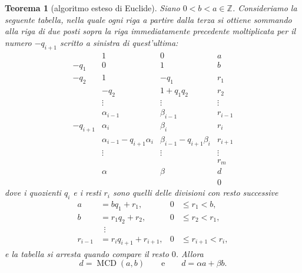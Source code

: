 \documentclass[11pt,a4paper]{article}
\newcommand{\Z}{\mathbb{Z}}
\theoremstyle{definition}
\theoremstyle{plain}
\newtheorem{teorema}[definizione]{Teorema}
\theoremstyle{remark}
\begin{document}
\begin{teorema}[algoritmo esteso di Euclide]\label{thm:euclide}
Siano $0<b<a\in\Z$. Consideriamo la seguente tabella, nella quale ogni riga a partire dalla terza si ottiene sommando alla riga di due posti sopra la riga immediatamente precedente moltiplicata per il numero $-q_{i+1}$ scritto a sinistra di quest'ultima:
\[
\begin{array}{r|rr|r}
 & 1 & 0 & a\\
-q_1 & 0 & 1 & b\\
-q_2 & 1 & -q_1 & r_1\\
 & -q_2 & 1+q_1q_2 & r_2\\[2pt]
 & \vdots & \vdots & \vdots\\[2pt]
 & \alpha_{i-1} & \beta_{i-1} & r_{i-1}\\
-q_{i+1} & \alpha_i & \beta_i & r_i\\
 & \alpha_{i-1}-q_{i+1}\alpha_i & \beta_{i-1}-q_{i+1}\beta_i & r_{i+1}\\[2pt]
 & \vdots & \vdots & \vdots\\[2pt]
 & & & r_m\\
 & \alpha & \beta & d\\
 & & & 0
\end{array}
\]
dove i quozienti $q_i$ e i resti $r_i$ sono quelli delle divisioni con resto successive
\begin{align*}
a&=bq_1+r_1, & 0&\le r_1<b,\\
b&=r_1q_2+r_2, & 0&\le r_2<r_1,\\
&\ \ \vdots\\
r_{i-1}&=r_iq_{i+1}+r_{i+1}, & 0&\le r_{i+1}<r_i,
\end{align*}
e la tabella si arresta quando compare il resto $0$. Allora
\[
d=\operatorname{MCD}(a,b)\qquad\text{e}\qquad d=\alpha a+\beta b .
\]
\end{teorema}
\end{document}
